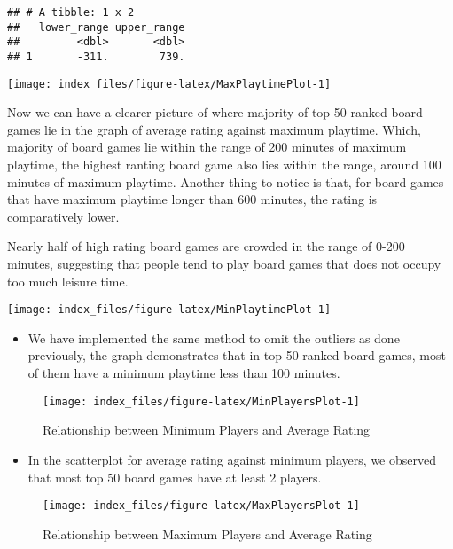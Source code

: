 \documentclass[
]{article}
\providecommand{\tightlist}{%
  \setlength{\itemsep}{0pt}\setlength{\parskip}{0pt}}
\begin{document}
\begin{verbatim}
## # A tibble: 1 x 2
##   lower_range upper_range
##         <dbl>       <dbl>
## 1       -311.        739.
\end{verbatim}

\begin{center}\texttt{[image: index\_files/figure-latex/MaxPlaytimePlot-1]} \end{center}

Now we can have a clearer picture of where majority of top-50 ranked board games lie in the graph of average rating against maximum playtime. Which, majority of board games lie within the range of 200 minutes of maximum playtime, the highest ranting board game also lies within the range, around 100 minutes of maximum playtime. Another thing to notice is that, for board games that have maximum playtime longer than 600 minutes, the rating is comparatively lower.

Nearly half of high rating board games are crowded in the range of 0-200 minutes, suggesting that people tend to play board games that does not occupy too much leisure time.

\begin{center}\texttt{[image: index\_files/figure-latex/MinPlaytimePlot-1]} \end{center}

\begin{itemize}
\tightlist
\item
  We have implemented the same method to omit the outliers as done previously, the graph demonstrates that in top-50 ranked board games, most of them have a minimum playtime less than 100 minutes.
\end{itemize}

\begin{figure}[H]

{\centering \texttt{[image: index\_files/figure-latex/MinPlayersPlot-1]} 

}

\caption{Relationship between Minimum Players and Average Rating}\label{fig:MinPlayersPlot}
\end{figure}

\begin{itemize}
\tightlist
\item
  In the scatterplot for average rating against minimum players, we observed that most top 50 board games have at least 2 players.
\end{itemize}

\begin{figure}[H]

{\centering \texttt{[image: index\_files/figure-latex/MaxPlayersPlot-1]} 

}

\caption{Relationship between Maximum Players and Average Rating}\label{fig:MaxPlayersPlot}
\end{figure}
\end{document}
